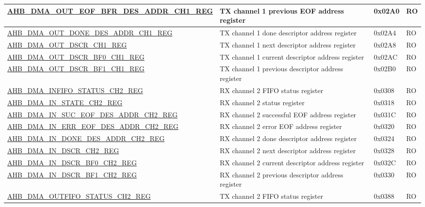 \begin{longtable}{ | l | p{10cm} | p{1.3cm} | l | }
\hyperref[regdesc:AHBDMAOUTEOFBFRDESADDRCHNREG]{AHB\_DMA\_OUT\_EOF\_BFR\_DES\_ADDR\_CH1\_REG} & TX channel 1 previous EOF address register & 0x02A0 & RO \\ \hline
\hyperref[regdesc:AHBDMAOUTDONEDESADDRCHNREG]{AHB\_DMA\_OUT\_DONE\_DES\_ADDR\_CH1\_REG} & TX channel 1 done descriptor address register & 0x02A4 & RO \\ \hline
\hyperref[regdesc:AHBDMAOUTDSCRCHNREG]{AHB\_DMA\_OUT\_DSCR\_CH1\_REG} & TX channel 1 next descriptor address register & 0x02A8 & RO \\ \hline
\hyperref[regdesc:AHBDMAOUTDSCRBF0CHNREG]{AHB\_DMA\_OUT\_DSCR\_BF0\_CH1\_REG} & TX channel 1 current descriptor address register & 0x02AC & RO \\ \hline
\hyperref[regdesc:AHBDMAOUTDSCRBF1CHNREG]{AHB\_DMA\_OUT\_DSCR\_BF1\_CH1\_REG} & TX channel 1 previous descriptor address register & 0x02B0 & RO \\ \hline
\hyperref[regdesc:AHBDMAINFIFOSTATUSCHNREG]{AHB\_DMA\_INFIFO\_STATUS\_CH2\_REG} & RX channel 2 FIFO status register & 0x0308 & RO \\ \hline
\hyperref[regdesc:AHBDMAINSTATECHNREG]{AHB\_DMA\_IN\_STATE\_CH2\_REG} & RX channel 2 status register & 0x0318 & RO \\ \hline
\hyperref[regdesc:AHBDMAINSUCEOFDESADDRCHNREG]{AHB\_DMA\_IN\_SUC\_EOF\_DES\_ADDR\_CH2\_REG} & RX channel 2 successful EOF address register & 0x031C & RO \\ \hline
\hyperref[regdesc:AHBDMAINERREOFDESADDRCHNREG]{AHB\_DMA\_IN\_ERR\_EOF\_DES\_ADDR\_CH2\_REG} & RX channel 2 error EOF address register & 0x0320 & RO \\ \hline
\hyperref[regdesc:AHBDMAINDONEDESADDRCHNREG]{AHB\_DMA\_IN\_DONE\_DES\_ADDR\_CH2\_REG} & RX channel 2 done descriptor address register & 0x0324 & RO \\ \hline
\hyperref[regdesc:AHBDMAINDSCRCHNREG]{AHB\_DMA\_IN\_DSCR\_CH2\_REG} & RX channel 2 next descriptor address register & 0x0328 & RO \\ \hline
\hyperref[regdesc:AHBDMAINDSCRBF0CHNREG]{AHB\_DMA\_IN\_DSCR\_BF0\_CH2\_REG} & RX channel 2 current descriptor address register & 0x032C & RO \\ \hline
\hyperref[regdesc:AHBDMAINDSCRBF1CHNREG]{AHB\_DMA\_IN\_DSCR\_BF1\_CH2\_REG} & RX channel 2 previous descriptor address register & 0x0330 & RO \\ \hline
\hyperref[regdesc:AHBDMAOUTFIFOSTATUSCHNREG]{AHB\_DMA\_OUTFIFO\_STATUS\_CH2\_REG} & TX channel 2 FIFO status register & 0x0388 & RO \\ \hline

\end{longtable}
